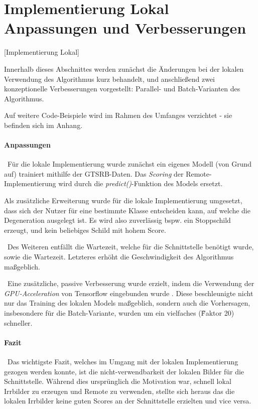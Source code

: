 \newpage
\section{Implementierung Lokal \newline Anpassungen und Verbesserungen}[Implementierung Lokal] 

Innerhalb dieses Abschnittes werden zunächst die Änderungen bei der lokalen Verwendung des Algorithmus kurz behandelt, und anschließend zwei konzeptionelle Verbesserungen vorgestellt: Parallel- und Batch-Varianten des Algorithmus. 

Auf weitere Code-Beispiele wird im Rahmen des Umfanges verzichtet - sie befinden sich im Anhang.

\paragraph{Anpassungen} ~\newline Für die lokale Implementierung wurde zunächst ein eigenes Modell (von Grund auf) trainiert mithilfe der GTSRB-Daten. Das \textit{Scoring} der Remote-Implementierung wird durch die \textit{predict()}-Funktion des Models ersetzt.

Als zusätzliche Erweiterung wurde für die lokale Implementierung umgesetzt, dass sich der Nutzer für eine bestimmte Klasse entscheiden kann, auf welche die Degeneration ausgelegt ist. Es wird also zuverlässig bspw. ein Stoppschild erzeugt, und kein beliebiges Schild mit hohem Score. 

~\newline Des Weiteren entfällt die Wartezeit, welche für die Schnittstelle benötigt wurde, sowie die Wartezeit. Letzteres erhöht die Geschwindigkeit des Algorithmus maßgeblich. 

~\newline Eine zusätzliche, passive Verbesserung wurde erzielt, indem die Verwendung der \textit{GPU-Acceleration} von Tensorflow eingebunden wurde . Diese beschleunigte nicht nur das Training des lokalen Models maßgeblich, sondern auch die Vorhersagen, insbesondere für die Batch-Variante, wurden um ein vielfaches (\~Faktor 20) schneller.  

\paragraph{Fazit}~\newline Das wichtigste Fazit, welches im Umgang mit der lokalen Implementierung gezogen werden konnte, ist die nicht-verwendbarkeit der lokalen Bilder für die Schnittstelle. Während dies ursprünglich die Motivation war, schnell lokal Irrbilder zu erzeugen und Remote zu verwenden, stellte sich heraus das die lokalen Irrbilder keine guten Scores an der Schnittstelle erzielten und vice versa. 


